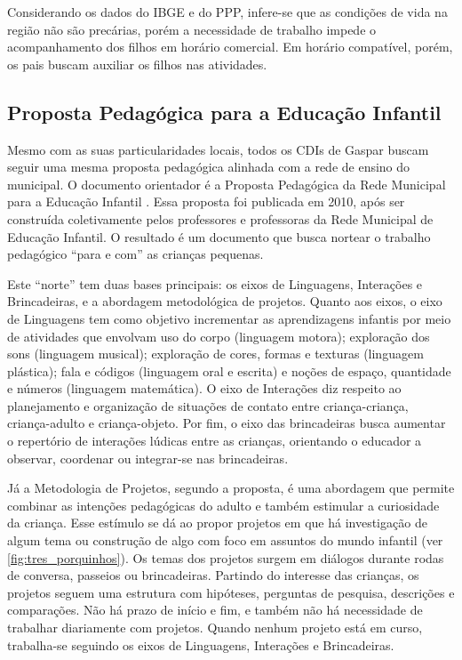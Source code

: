 Considerando os dados do IBGE e do PPP, infere-se que as condições de vida na região não são precárias, porém a necessidade de trabalho impede o acompanhamento dos filhos em horário comercial. Em horário compatível, porém, os pais buscam auxiliar os filhos nas atividades.

\subsection{Proposta Pedagógica para a Educação Infantil}
Mesmo com as suas particularidades locais, todos os CDIs de Gaspar buscam seguir uma mesma proposta pedagógica alinhada com a rede de ensino do municipal. O documento orientador é a Proposta Pedagógica da Rede Municipal para a Educação Infantil \cite{gaspar_proposta_2010}. Essa proposta foi publicada em 2010, após ser construída coletivamente pelos professores e professoras da Rede Municipal de Educação Infantil. O resultado é um documento que busca nortear o trabalho pedagógico “para e com” as crianças pequenas.

Este “norte” tem duas bases principais: os eixos de Linguagens, Interações e Brincadeiras, e a abordagem metodológica de projetos. Quanto aos eixos, o eixo de Linguagens tem como objetivo incrementar as aprendizagens infantis por meio de atividades que envolvam uso do corpo (linguagem motora); exploração dos sons (linguagem musical); exploração de cores, formas e texturas (linguagem plástica); fala e códigos (linguagem oral e escrita) e noções de espaço, quantidade e números (linguagem matemática). O eixo de Interações diz respeito ao planejamento e organização de situações de contato entre criança-criança, criança-adulto e criança-objeto. Por fim, o eixo das brincadeiras busca aumentar o repertório de interações lúdicas entre as crianças, orientando o educador a observar, coordenar ou integrar-se nas brincadeiras.

Já a Metodologia de Projetos, segundo a proposta, é uma abordagem que permite combinar as intenções pedagógicas do adulto e também estimular a curiosidade da criança. Esse estímulo se dá ao propor projetos em que há investigação de algum tema ou construção de algo com foco em assuntos do mundo infantil (ver \autoref{fig:tres_porquinhos}). Os temas dos projetos surgem em diálogos durante rodas de conversa, passeios ou brincadeiras. Partindo do interesse das crianças, os projetos seguem uma estrutura com hipóteses, perguntas de pesquisa, descrições e comparações. Não há prazo de início e fim, e também não há necessidade de trabalhar diariamente com projetos. Quando nenhum projeto está em curso, trabalha-se seguindo os eixos de Linguagens, Interações e Brincadeiras.

